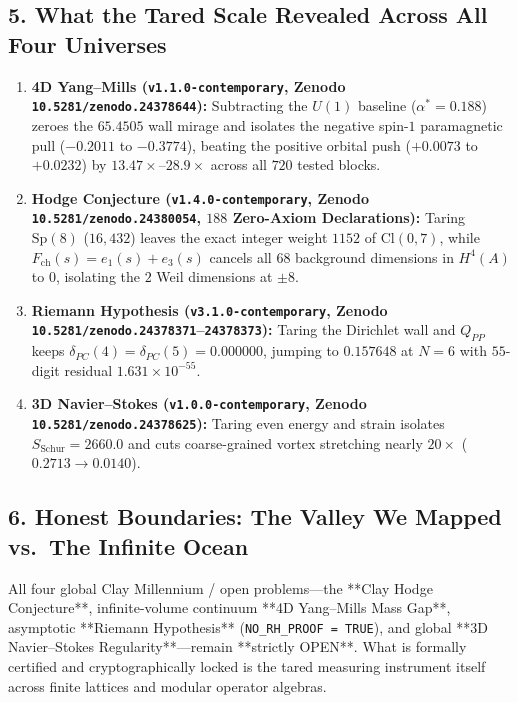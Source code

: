 \documentclass[11pt,a4paper]{article}
\begin{document}
\subsection*{5. What the Tared Scale Revealed Across All Four Universes}

\begin{enumerate}[leftmargin=1.6em]
  \item \textbf{4D Yang--Mills (\texttt{v1.1.0-contemporary}, Zenodo \texttt{10.5281/zenodo.24378644}):} Subtracting the $U(1)$ baseline ($\alpha^*=0.188$) zeroes the $65.4505$ wall mirage and isolates the negative spin-$1$ paramagnetic pull ($-0.2011$ to $-0.3774$), beating the positive orbital push ($+0.0073$ to $+0.0232$) by $13.47\times$--$28.9\times$ across all $720$ tested blocks.
  \item \textbf{Hodge Conjecture (\texttt{v1.4.0-contemporary}, Zenodo \texttt{10.5281/zenodo.24380054}, $188$ Zero-Axiom Declarations):} Taring $\mathrm{Sp}(8)$ ($16, 432$) leaves the exact integer weight $1152$ of $\mathrm{Cl}(0,7)$, while $F_{\mathrm{ch}}(s) = e_1(s) + e_3(s)$ cancels all $68$ background dimensions in $H^4(A)$ to $0$, isolating the $2$ Weil dimensions at $\pm 8$.
  \item \textbf{Riemann Hypothesis (\texttt{v3.1.0-contemporary}, Zenodo \texttt{10.5281/zenodo.24378371}--\texttt{24378373}):} Taring the Dirichlet wall and $Q_{PP}$ keeps $\delta_{PC}(4)=\delta_{PC}(5)=0.000000$, jumping to $0.157648$ at $N=6$ with $55$-digit residual $1.631\times 10^{-55}$.
  \item \textbf{3D Navier--Stokes (\texttt{v1.0.0-contemporary}, Zenodo \texttt{10.5281/zenodo.24378625}):} Taring even energy and strain isolates $S_{\mathrm{Schur}} = 2660.0$ and cuts coarse-grained vortex stretching nearly $20\times$ ($0.2713 \to 0.0140$).
\end{enumerate}

\subsection*{6. Honest Boundaries: The Valley We Mapped vs.\ The Infinite Ocean}

All four global Clay Millennium / open problems---the **Clay Hodge Conjecture**, infinite-volume continuum **4D Yang--Mills Mass Gap**, asymptotic **Riemann Hypothesis** (\texttt{NO\_RH\_PROOF = TRUE}), and global **3D Navier--Stokes Regularity**---remain **strictly OPEN**. What is formally certified and cryptographically locked is the tared measuring instrument itself across finite lattices and modular operator algebras.
\end{document}
